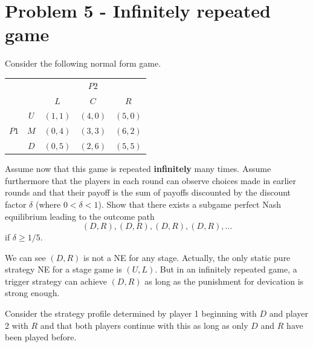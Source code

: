 \documentclass{article}
\begin{document}

\section{Problem 5 - Infinitely repeated game}

Consider the following normal form game.

\begin{center}
\label{tab:infi}
\begin{tabular}{cc|c|c|c|}
  & \multicolumn{1}{c}{} & \multicolumn{3}{c}{$P2$}  \\
  & \multicolumn{1}{c}{} & \multicolumn{1}{c}{$L$} & \multicolumn{1}{c}{$C$} & \multicolumn{1}{c}{$R$} \\\cline{3-5}
            & $U$ & $(1,1)$ & $(4,0)$  & $(5,0)$ \\   \cline{3-5}  
      $P1$  & $M$ & $(0,4)$ & $(3,3)$  & $(6,2)$ \\   \cline{3-5}
            & $D$ & $(0,5)$ & $(2,6)$  & $(5,5)$ \\   \cline{3-5}

\end{tabular}
\end{center}

Assume now that this game is repeated \textbf{infinitely} many times. Assume furthermore that the players in each round can observe choices made in earlier rounds and that their payoff is the sum of payoffs discounted by the discount factor   $\delta$ (where $0 < \delta < 1$). Show that there exists a subgame perfect Nash equilibrium leading to the outcome path
$$(D, R), (D, R), (D, R), (D, R), \dots $$
if $\delta \geq 1/5$. 

\bigskip

\begin{mdframed}[backgroundcolor=blue!20,linecolor=white]
We can see $(D,R)$ is not a NE for any stage. Actually, the only static pure strategy NE for a stage game is $(U,L)$. But in an infinitely repeated game, a trigger strategy can achieve $(D,R)$ as long as the punishment for devication is strong enough.
\end{mdframed}

Consider the strategy profile determined by player 1 beginning with $D$ and player 2 with $R$ and that both players continue with this as long as only $D$ and $R$ have been played before. 
\end{document}
